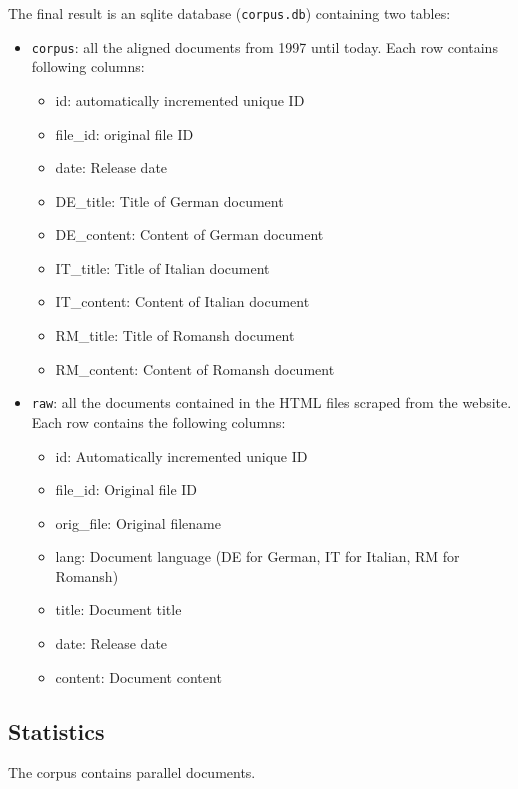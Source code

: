 The final result is an sqlite database (\texttt{corpus.db}) containing two tables:
\begin{itemize}
	\item \texttt{corpus}: all the aligned documents from 1997 until today. 
	Each row contains following columns:
	\begin{itemize}
		\item id: automatically incremented unique ID
		\item file\_id: original file ID
		\item date: Release date
		\item DE\_title: Title of German document
		\item DE\_content: Content of German document
		\item IT\_title: Title of Italian document
		\item IT\_content: Content of Italian document
		\item RM\_title: Title of Romansh document
		\item RM\_content: Content of Romansh document
	\end{itemize}
	\item \texttt{raw}: all the documents contained in the HTML files scraped from the website. 
	Each row contains the following columns:
	\begin{itemize}
		\item id: Automatically incremented unique ID
		\item file\_id: Original file ID
		\item orig\_file: Original filename
		\item lang: Document language (DE for German, IT for Italian, RM for Romansh)
		\item title: Document title
		\item date: Release date
		\item content: Document content
	\end{itemize}
\end{itemize}

\subsection{Statistics}
The corpus contains  parallel documents.

